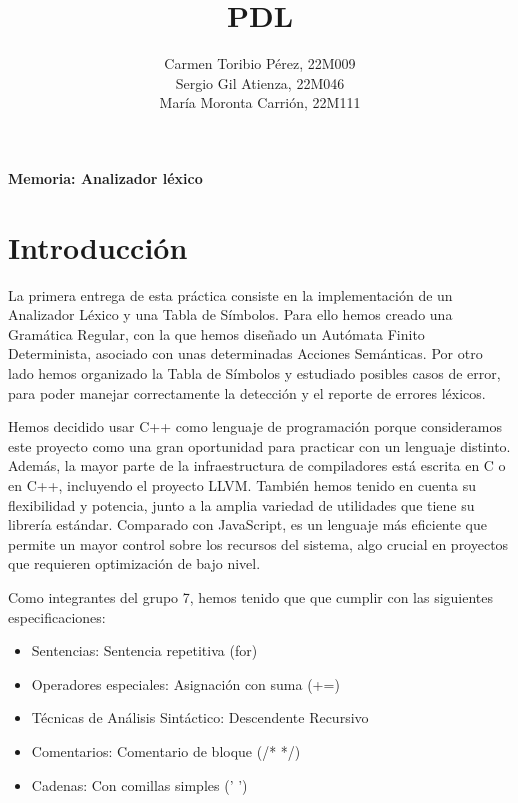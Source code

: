 \documentclass{article}
\title{PDL}
\begin{document}
\textbf{Memoria: Analizador léxico}
\author{Carmen Toribio Pérez, 22M009\\Sergio Gil Atienza, 22M046\\María Moronta Carrión, 22M111}
\date{}




\maketitle

\section{Introducción}

La primera entrega de esta práctica consiste en la implementación de un Analizador Léxico y una Tabla de Símbolos. Para ello hemos creado una Gramática Regular, con la que hemos diseñado un Autómata Finito Determinista, asociado con unas determinadas Acciones Semánticas. Por otro lado hemos organizado la Tabla de Símbolos y estudiado posibles casos de error, para poder manejar correctamente la detección y el reporte de errores léxicos. 

\vspace{0.5cm}

Hemos decidido usar C++ como lenguaje de programación porque consideramos este proyecto como una gran oportunidad para practicar con un lenguaje distinto. Además, la mayor parte de la infraestructura de compiladores está escrita en C o en C++, incluyendo el proyecto LLVM. También hemos tenido en cuenta su flexibilidad y potencia, junto a la amplia variedad de utilidades que tiene su librería estándar. Comparado con JavaScript, es un lenguaje más eficiente que permite un mayor control sobre los recursos del sistema, algo crucial en proyectos que requieren optimización de bajo nivel. 

\vspace{0.5cm}

Como integrantes del grupo 7, hemos tenido que que cumplir con las siguientes especificaciones: 
\begin{itemize} [left=2cm]
    \item Sentencias: Sentencia repetitiva (for)
    \item Operadores especiales: Asignación con suma (+=)
    \item Técnicas de Análisis Sintáctico: Descendente Recursivo
    \item Comentarios: Comentario de bloque (/* */)
    \item Cadenas: Con comillas simples (' ')
\end{itemize}
\end{document}
